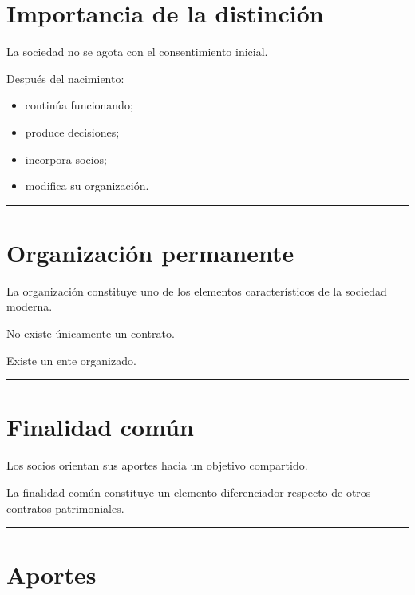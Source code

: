 \documentclass[
  spanish,
  letterpaper,
  DIV=11,
  numbers=noendperiod]{scrartcl}
\providecommand{\tightlist}{%
  \setlength{\itemsep}{0pt}\setlength{\parskip}{0pt}}
\begin{document}
\section{Importancia de la
distinción}\label{importancia-de-la-distinciuxf3n}

La sociedad no se agota con el consentimiento inicial.

Después del nacimiento:

\begin{itemize}
\tightlist
\item
  continúa funcionando;
\item
  produce decisiones;
\item
  incorpora socios;
\item
  modifica su organización.
\end{itemize}

\begin{center}\rule{0.5\linewidth}{0.5pt}\end{center}

\section{Organización permanente}\label{organizaciuxf3n-permanente}

La organización constituye uno de los elementos característicos de la
sociedad moderna.

No existe únicamente un contrato.

Existe un ente organizado.

\begin{center}\rule{0.5\linewidth}{0.5pt}\end{center}

\section{Finalidad común}\label{finalidad-comuxfan}

Los socios orientan sus aportes hacia un objetivo compartido.

La finalidad común constituye un elemento diferenciador respecto de
otros contratos patrimoniales.

\begin{center}\rule{0.5\linewidth}{0.5pt}\end{center}

\section{Aportes}\label{aportes}
\end{document}
